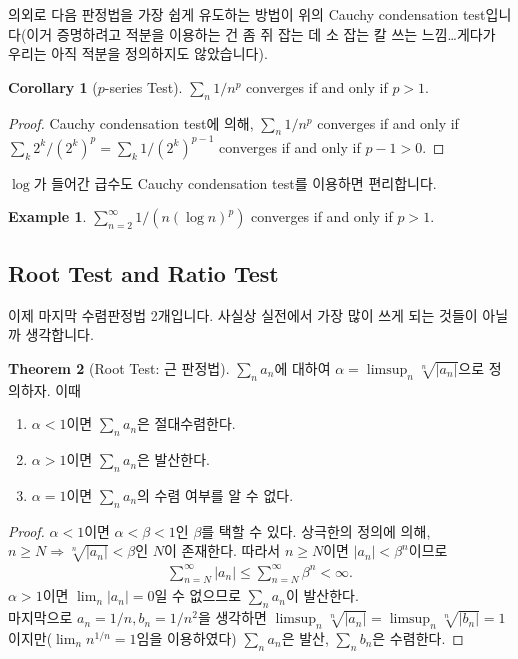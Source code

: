 \documentclass[12pt]{article}
\theoremstyle{definition}
\newtheorem{thm}{Theorem}[section]
\newtheorem{cor}[thm]{Corollary}
\newtheorem*{ex}{Example}
\newcommand{\abs}[1]{\left\vert#1\right\vert}
\begin{document}
의외로 다음 판정법을 가장 쉽게 유도하는 방법이 위의 Cauchy condensation test입니다(이거 증명하려고 적분을 이용하는 건 좀 쥐 잡는 데 소 잡는 칼 쓰는 느낌\ldots 게다가 우리는 아직 적분을 정의하지도 않았습니다).

\begin{cor}[\(p\)-series Test]
	\(\sum_n 1 / n^p\) converges if and only if \(p > 1\).
\end{cor}
\begin{proof}
	Cauchy condensation test에 의해, \(\sum_n 1 / n^p\) converges if and only if \(\sum_k 2^k / (2^k)^p = \sum_k 1 / (2^k)^{p-1}\) converges if and only if \(p - 1 > 0\).
\end{proof}

\(\log\)가 들어간 급수도 Cauchy condensation test를 이용하면 편리합니다.

\begin{ex}
	\(\sum_{n=2}^\infty 1/(n(\log n)^p)\) converges if and only if \(p > 1\).
\end{ex}

\subsection{Root Test and Ratio Test}

이제 마지막 수렴판정법 2개입니다. 사실상 실전에서 가장 많이 쓰게 되는 것들이 아닐까 생각합니다.

\begin{thm}[Root Test: 근 판정법]
	\(\sum_n a_n\)에 대하여 \(\alpha = \limsup_n \sqrt[n]{\abs{a_n}}\)으로 정의하자. 이때
	\begin{enumerate}[label=(\alph*), leftmargin=2\parindent]
		\item
		\(\alpha < 1\)이면 \(\sum_n a_n\)은 절대수렴한다.
		\item
		\(\alpha > 1\)이면 \(\sum_n a_n\)은 발산한다.
		\item
		\(\alpha = 1\)이면 \(\sum_n a_n\)의 수렴 여부를 알 수 없다.
	\end{enumerate}
\end{thm}
\begin{proof}
	\(\alpha < 1\)이면 \(\alpha < \beta < 1\)인 \(\beta\)를 택할 수 있다. 상극한의 정의에 의해, \(n \ge N \Rightarrow \sqrt[n]{\abs{a_n}} < \beta\)인 \(N\)이 존재한다. 따라서 \(n \ge N\)이면 \(\abs{a_n} < \beta^n\)이므로
	\begin{gather*}
		\sum_{n=N}^{\infty} \abs{a_n} \le \sum_{n=N}^{\infty} \beta^n < \infty.
	\end{gather*}
	\(\alpha > 1\)이면 \(\lim_n \abs{a_n} = 0\)일 수 없으므로 \(\sum_n a_n\)이 발산한다.\\
	마지막으로 \(a_n = 1/n, b_n = 1/n^2\)을 생각하면 \(\limsup_n \sqrt[n]{\abs{a_n}} = \limsup_n \sqrt[n]{\abs{b_n}} = 1\)이지만(\(\lim_n n^{1/n}=1\)임을 이용하였다) \(\sum_n a_n\)은 발산, \(\sum_n b_n\)은 수렴한다.
\end{proof}
\end{document}
